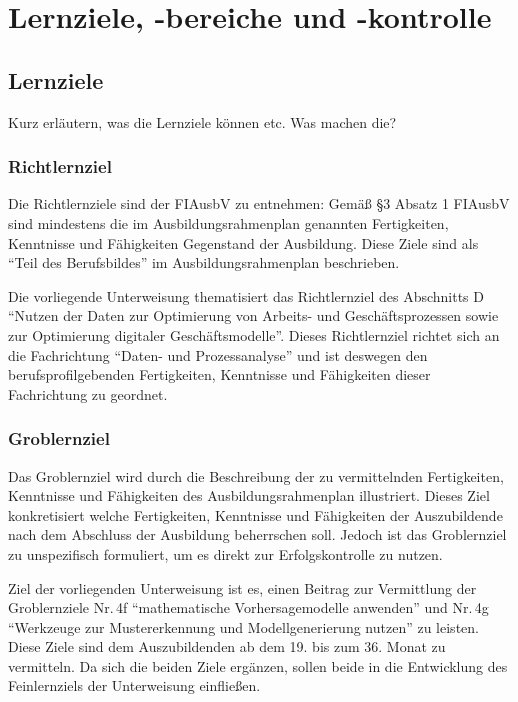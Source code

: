 \chapter{Lernziele, -bereiche und -kontrolle}

\section{Lernziele}
Kurz erläutern, was die Lernziele können etc. Was machen die?
\subsection{Richtlernziel}
Die Richtlernziele sind der \ac{FIAusbV} zu entnehmen: Gemäß §3 Absatz 1 FIAusbV\autocite[][§3 I FIAusbV]{bundesminister_fur_wirtschaft_und_energie_verordnung_2020} sind mindestens die im Ausbildungsrahmenplan genannten Fertigkeiten, Kenntnisse und Fähigkeiten Gegenstand der Ausbildung. Diese Ziele sind als \enquote{Teil des Berufsbildes} im Ausbildungsrahmenplan beschrieben. 
\par
Die vorliegende Unterweisung thematisiert das Richtlernziel des Abschnitts D \enquote{Nutzen der Daten zur Optimierung von Arbeits- und Geschäftsprozessen sowie zur Optimierung digitaler Geschäftsmodelle}\autocite[vgl.][§4 V Nr.\,3 FIAusbV]{bundesminister_fur_wirtschaft_und_energie_verordnung_2020}. Dieses Richtlernziel richtet sich an die Fachrichtung \enquote{Daten- und Prozessanalyse} und ist deswegen den berufsprofilgebenden Fertigkeiten, Kenntnisse und Fähigkeiten dieser Fachrichtung zu geordnet.

\subsection{Groblernziel}
Das Groblernziel wird durch die Beschreibung der zu vermittelnden Fertigkeiten, Kenntnisse und Fähigkeiten des Ausbildungsrahmenplan illustriert. Dieses Ziel konkretisiert welche Fertigkeiten, Kenntnisse und Fähigkeiten der Auszubildende nach dem Abschluss der Ausbildung beherrschen soll. Jedoch ist das Groblernziel zu unspezifisch formuliert, um es direkt zur Erfolgskontrolle zu nutzen. 
\par
Ziel der vorliegenden Unterweisung ist es, einen Beitrag zur Vermittlung der Groblernziele Nr.\,4f \enquote{mathematische Vorhersagemodelle anwenden} und Nr.\,4g \enquote{Werkzeuge zur Mustererkennung und Modellgenerierung nutzen} zu leisten. Diese Ziele sind dem Auszubildenden ab dem 19. bis zum 36. Monat zu vermitteln. Da sich die beiden Ziele ergänzen, sollen beide in die Entwicklung des Feinlernziels der Unterweisung einfließen. 
 
